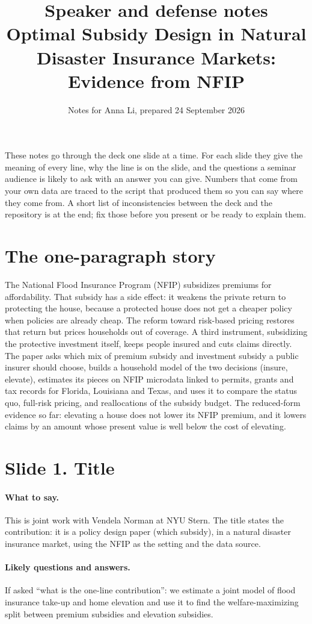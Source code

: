 \documentclass[11pt]{article}
\title{Speaker and defense notes\\ \large Optimal Subsidy Design in Natural Disaster Insurance Markets: Evidence from NFIP}
\author{Notes for Anna Li, prepared 24 September 2026}
\date{}
\newcommand{\slide}[2]{\section*{Slide #1. #2}\addcontentsline{toc}{section}{Slide #1. #2}}
\newcommand{\say}{\paragraph{What to say.}}
\newcommand{\qa}{\paragraph{Likely questions and answers.}}
\begin{document}
\maketitle

\noindent These notes go through the deck one slide at a time. For each slide they give the meaning of every line, why the line is on the slide, and the questions a seminar audience is likely to ask with an answer you can give. Numbers that come from your own data are traced to the script that produced them so you can say where they come from. A short list of inconsistencies between the deck and the repository is at the end; fix those before you present or be ready to explain them.

\tableofcontents
\bigskip

\section*{The one-paragraph story}
The National Flood Insurance Program (NFIP) subsidizes premiums for affordability. That subsidy has a side effect: it weakens the private return to protecting the house, because a protected house does not get a cheaper policy when policies are already cheap. The reform toward risk-based pricing restores that return but prices households out of coverage. A third instrument, subsidizing the protective investment itself, keeps people insured and cuts claims directly. The paper asks which mix of premium subsidy and investment subsidy a public insurer should choose, builds a household model of the two decisions (insure, elevate), estimates its pieces on NFIP microdata linked to permits, grants and tax records for Florida, Louisiana and Texas, and uses it to compare the status quo, full-risk pricing, and reallocations of the subsidy budget. The reduced-form evidence so far: elevating a house does not lower its NFIP premium, and it lowers claims by an amount whose present value is well below the cost of elevating.

\slide{1}{Title}
\say This is joint work with Vendela Norman at NYU Stern. The title states the contribution: it is a policy design paper (which subsidy), in a natural disaster insurance market, using the NFIP as the setting and the data source.

\qa If asked ``what is the one-line contribution'': we estimate a joint model of flood insurance take-up and home elevation and use it to find the welfare-maximizing split between premium subsidies and elevation subsidies.
\end{document}
